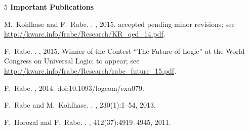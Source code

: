 \noindent
\textbf{$5$ Important Publications}
\begin{compactitem}%
M.~Kohlhase and F.~Rabe.
.
, 2015.
\newblock accepted pending minor revisions; see
  \url{http://kwarc.info/frabe/Research/KR_qed_14.pdf}.

F.~Rabe.
.
, 2015.
\newblock Winner of the Contest ``The Future of Logic'' at the World Congress
  on Universal Logic; to appear; see
  \url{http://kwarc.info/frabe/Research/rabe_future_15.pdf}.

F.~Rabe.
, 2014.
\newblock doi:10.1093/logcom/exu079.

F.~Rabe and M.~Kohlhase.
.
, 230(1):1--54, 2013.

F.~Horozal and F.~Rabe.
.
, 412(37):4919--4945, 2011.
\end{compactitem}





